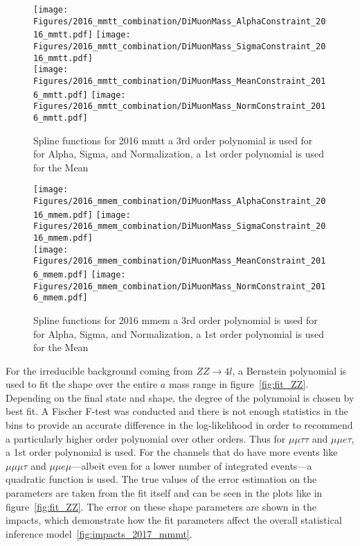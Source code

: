 \begin{figure}[ht!b]
    \centering 
    \texttt{[image: Figures/2016\_mmtt\_combination/DiMuonMass\_AlphaConstraint\_2016\_mmtt.pdf]}
    \texttt{[image: Figures/2016\_mmtt\_combination/DiMuonMass\_SigmaConstraint\_2016\_mmtt.pdf]}\\
    \texttt{[image: Figures/2016\_mmtt\_combination/DiMuonMass\_MeanConstraint\_2016\_mmtt.pdf]}
    \texttt{[image: Figures/2016\_mmtt\_combination/DiMuonMass\_NormConstraint\_2016\_mmtt.pdf]}\\
    \caption{\label{fig:spline_2016_mmtt} Spline functions for 2016 mmtt a 3rd order polynomial is used for  for Alpha, Sigma, and Normalization, a 1st order polynomial is used for the Mean}
\end{figure}
\begin{figure}[ht!b]
    \centering 
    \texttt{[image: Figures/2016\_mmem\_combination/DiMuonMass\_AlphaConstraint\_2016\_mmem.pdf]}
    \texttt{[image: Figures/2016\_mmem\_combination/DiMuonMass\_SigmaConstraint\_2016\_mmem.pdf]}\\
    \texttt{[image: Figures/2016\_mmem\_combination/DiMuonMass\_MeanConstraint\_2016\_mmem.pdf]}
    \texttt{[image: Figures/2016\_mmem\_combination/DiMuonMass\_NormConstraint\_2016\_mmem.pdf]}\\
    \caption{\label{fig:spline_2016_mmem} Spline functions for 2016 mmem a 3rd order polynomial is used for  for Alpha, Sigma, and Normalization, a 1st order polynomial is used for the Mean}
\end{figure}

For the irreducible background coming from $ZZ\rightarrow 4 l$, a Bernstein polynomial is used to fit the shape over the entire $a$ mass range in figure~\ref{fig:fit_ZZ}. Depending on the final state and shape, the degree of the polynmoial is chosen by best fit. A Fischer F-test was conducted and there is not enough statistics in the bins to provide an accurate difference in the log-likelihood in order to recommend a particularly higher order polynomial over other orders. Thus for $\mu\mu\tau\tau$ and $\mu\mu e \tau$, a 1st order polynomial is used. For the channels that do have more events like $\mu\mu\mu\tau$ and $\mu\mu e \mu$---albeit even for a lower number of integrated events---a quadratic function is used. 
The true values of the error estimation on the parameters are taken from the fit itself and can be seen in the plots like in figure~\ref{fig:fit_ZZ}. The error on these shape parameters are shown in the impacts, which demonstrate how the fit parameters affect the overall statistical inference model~\ref{fig:impacts_2017_mmmt}. 

